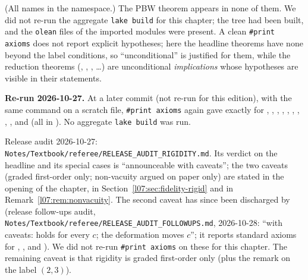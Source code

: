 (All names in the  namespace.) The PBW theorem  appears in none of them. We did not
re-run the aggregate \texttt{lake build} for this chapter; the tree had been built, and the \texttt{olean} files of
the imported modules were present. A clean \texttt{\#print axioms} does not report explicit hypotheses; here the
headline theorems have none beyond the label conditions, so ``unconditional'' is justified for them, while the
reduction theorems (, ,
, \ldots) are unconditional \emph{implications} whose hypotheses are
visible in their statements.

\textbf{Re-run 2026-10-27.} At a later commit (not re-run for this edition), with the same command on a
scratch file, \texttt{\#print axioms} again gave exactly  for
, ,
, ,
, ,
, ,
,  and
 (all in ). No aggregate \texttt{lake build} was run.

Release audit 2026-10-27: \texttt{Notes/Textbook/referee/RELEASE\_AUDIT\_RIGIDITY.md}. Its verdict on the
headline and its special cases is ``announceable with caveats''; the two caveats (graded first-order only;
non-vacuity argued on paper only) are stated in the opening of the chapter, in
Section~\ref{l07:sec:fidelity-rigid} and in Remark~\ref{l07:rem:nonvacuity}. The second caveat has since been
discharged by \allowbreak{}\allowbreak{}\allowbreak{}\allowbreak{} (release follow-ups audit,
\texttt{Notes/Textbook/referee/RELEASE\_AUDIT\_FOLLOWUPS.md}, 2026-10-28: ``with caveats: holds for every $c$; the
deformation moves $c$''; it reports standard axioms for , ,
 and ). We did not re-run \texttt{\#print axioms} on these
for this chapter. The remaining caveat is that rigidity is graded first-order only (plus the remark on the label
$(2,3)$).


